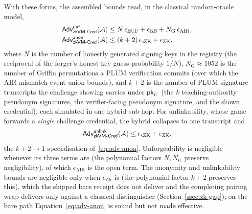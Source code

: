 With these forms, the assembled bounds read, in the classical random-oracle model,
\begin{align}
  \mathsf{Adv}^{\mathsf{unf}}_{\mathsf{zkVM\text{-}Cred}}(\mathcal{A})
  &\le N\,\epsilon_{\mathrm{EUF}} + \epsilon_{\mathrm{KS}}
       + N_{\mathrm{G}}\,\epsilon_{\mathrm{AIR}},
  \label{eq:adv-unf}\\
  \mathsf{Adv}^{\mathsf{anon}}_{\mathsf{zkVM\text{-}Cred}}(\mathcal{A})
  &\le (k+2)\,\epsilon_{\mathrm{sZK}} + \epsilon_{\mathrm{ZK}},
  \label{eq:adv-anon}
\end{align}
where $N$ is the number of honestly generated signing keys in the registry (the reciprocal of the forger's honest-key guess probability $1/N$), $N_{\mathrm G} \approx 1052$ is the number of Griffin permutations a PLUM verification commits (over which the AIR-mismatch event union-bounds), and $k+2$ is the number of PLUM signature transcripts the challenge showing carries under $\mathsf{pk}_U$ (the $k$ teaching-authority pseudonym signatures, the verifier-facing pseudonym signature, and the shown credential), each simulated in one hybrid sub-hop. For unlinkability, whose game forwards a \emph{single} challenge credential, the hybrid collapses to one transcript and
\begin{equation*}
  \mathsf{Adv}^{\mathsf{unlink}}_{\mathsf{zkVM\text{-}Cred}}(\mathcal{A})
  \le \epsilon_{\mathrm{sZK}} + \epsilon_{\mathrm{ZK}},
\end{equation*}
the $k+2\to1$ specialisation of~\eqref{eq:adv-anon}. Unforgeability is negligible whenever its three terms are (the polynomial factors $N,N_{\mathrm G}$ preserve negligibility), of which $\epsilon_{\mathrm{AIR}}$ is the open term. The anonymity and unlinkability bounds are negligible only when $\epsilon_{\mathrm{ZK}}$ is (the polynomial factor $k+2$ preserves this), which the shipped bare receipt does not deliver and the completing pairing wrap delivers only against a classical distinguisher (Section~\ref{ssec:zk-gap}); on the bare path Equation~\eqref{eq:adv-anon} is sound but not made effective.

